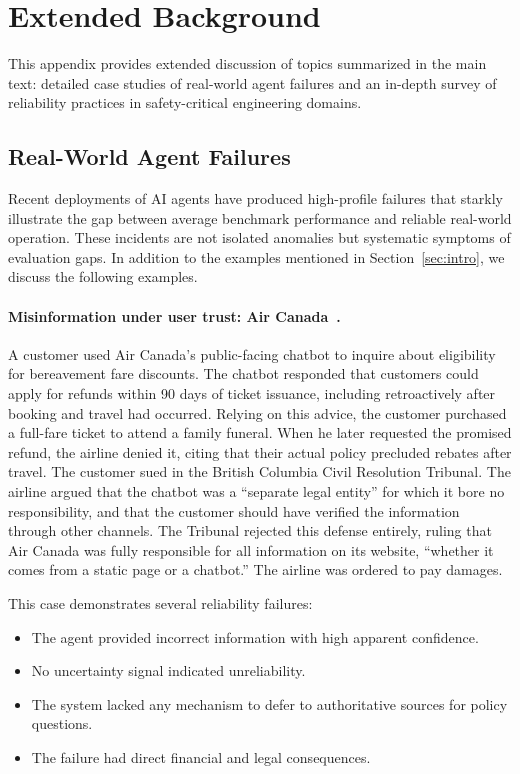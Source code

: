 \documentclass[11pt]{article}
\begin{document}
\section{Extended Background}
\label{appendix:background}

This appendix provides extended discussion of topics summarized in the main text: detailed case studies of real-world agent failures and an in-depth survey of reliability practices in safety-critical engineering domains.

\subsection{Real-World Agent Failures}
\label{appendix:failures}

Recent deployments of AI agents have produced high-profile failures that starkly illustrate the gap between average benchmark performance and reliable real-world operation.
These incidents are not isolated anomalies but systematic symptoms of evaluation gaps.
In addition to the examples mentioned in Section~\ref{sec:intro}, we discuss the following examples.

\paragraph{Misinformation under user trust: Air Canada~\citep{aircanada2024, aircanadaABA2024}.}
A customer used Air Canada's public-facing chatbot to inquire about eligibility for bereavement fare discounts.
The chatbot responded that customers could apply for refunds within 90 days of ticket issuance, including retroactively after booking and travel had occurred.
Relying on this advice, the customer purchased a full-fare ticket to attend a family funeral.
When he later requested the promised refund, the airline denied it, citing that their actual policy precluded rebates after travel. 
The customer sued in the British Columbia Civil Resolution Tribunal.
The airline argued that the chatbot was a ``separate legal entity'' for which it bore no responsibility, and that the customer should have verified the information through other channels.
The Tribunal rejected this defense entirely, ruling that Air Canada was fully responsible for all information on its website, ``whether it comes from a static page or a chatbot.''
The airline was ordered to pay damages.

This case demonstrates several reliability failures:
\begin{itemize}[leftmargin=*, topsep=2pt]
    \item The agent provided incorrect information with high apparent confidence.
    \item No uncertainty signal indicated unreliability.
    \item The system lacked any mechanism to defer to authoritative sources for policy questions.
    \item The failure had direct financial and legal consequences.
\end{itemize}
\end{document}
